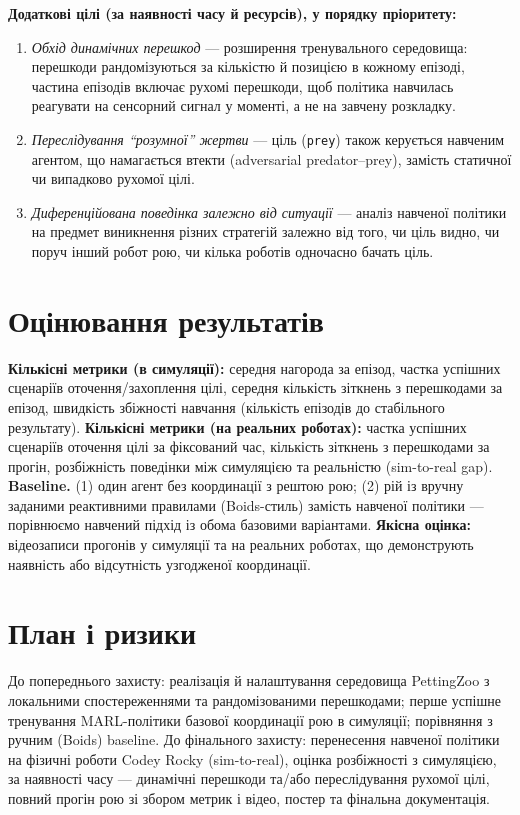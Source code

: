 \documentclass[ukrainian]{ucuproposal}
\begin{document}
\textbf{Додаткові цілі (за наявності часу й ресурсів), у порядку пріоритету:}
\begin{enumerate}
  \item \emph{Обхід динамічних перешкод} — розширення тренувального середовища: перешкоди рандомізуються за кількістю й позицією в кожному епізоді, частина епізодів включає рухомі перешкоди, щоб політика навчилась реагувати на сенсорний сигнал у моменті, а не на завчену розкладку.
  \item \emph{Переслідування ``розумної'' жертви} — ціль (\texttt{prey}) також керується навченим агентом, що намагається втекти (adversarial predator--prey), замість статичної чи випадково рухомої цілі.
  \item \emph{Диференційована поведінка залежно від ситуації} — аналіз навченої політики на предмет виникнення різних стратегій залежно від того, чи ціль видно, чи поруч інший робот рою, чи кілька роботів одночасно бачать ціль.
\end{enumerate}

\section{Оцінювання результатів}
\textbf{Кількісні метрики (в симуляції):} середня нагорода за епізод, частка успішних сценаріїв оточення/захоплення цілі, середня кількість зіткнень з перешкодами за епізод, швидкість збіжності навчання (кількість епізодів до стабільного результату). \textbf{Кількісні метрики (на реальних роботах):} частка успішних сценаріїв оточення цілі за фіксований час, кількість зіткнень з перешкодами за прогін, розбіжність поведінки між симуляцією та реальністю (sim-to-real gap). \textbf{Baseline.} (1) один агент без координації з рештою рою; (2) рій із вручну заданими реактивними правилами (Boids-стиль) замість навченої політики — порівнюємо навчений підхід із обома базовими варіантами. \textbf{Якісна оцінка:} відеозаписи прогонів у симуляції та на реальних роботах, що демонструють наявність або відсутність узгодженої координації.

\section{План і ризики}
До попереднього захисту: реалізація й налаштування середовища PettingZoo з локальними спостереженнями та рандомізованими перешкодами; перше успішне тренування MARL-політики базової координації рою в симуляції; порівняння з ручним (Boids) baseline. До фінального захисту: перенесення навченої політики на фізичні роботи Codey Rocky (sim-to-real), оцінка розбіжності з симуляцією, за наявності часу — динамічні перешкоди та/або переслідування рухомої цілі, повний прогін рою зі збором метрик і відео, постер та фінальна документація.
\end{document}
